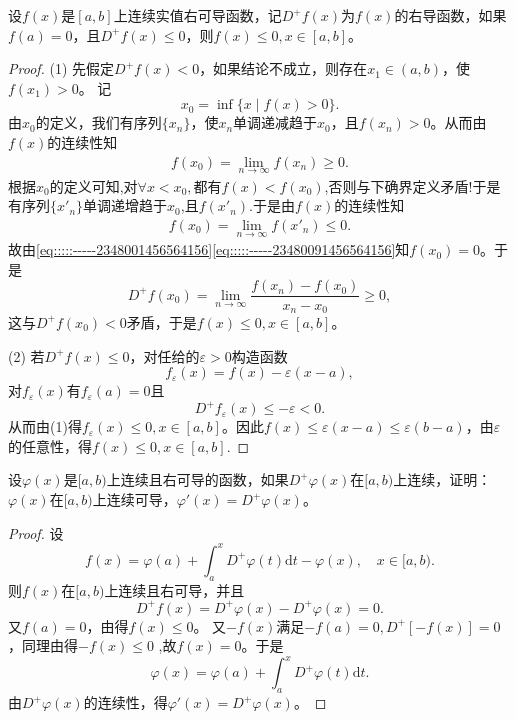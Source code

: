 \documentclass[../../main.tex]{subfiles}
\begin{document}
\begin{proposition}\label{proposition:右导数小于等于0函数值小于端点值}
设\( f(x) \)是\([a,b]\)上连续实值右可导函数，记\( D^+f(x) \)为\( f(x) \)的右导函数，如果\( f(a)=0 \)，且\( D^+f(x) \leqslant0 \)，则\( f(x) \leqslant0, x \in [a,b] \)。
\end{proposition}
\begin{proof}
(1) 先假定\( D^+f(x) < 0 \)，如果结论不成立，则存在\( x_1 \in (a,b) \)，使\( f(x_1) > 0 \)。
记
\[
x_0 = \inf\{ x \mid f(x) > 0 \}.
\]
由\( x_0 \)的定义，我们有序列\(\{ x_n \}\)，使\( x_n \)单调递减趋于\( x_0 \)，且\( f(x_n) > 0 \)。从而由\( f(x) \)的连续性知
\begin{align}
f\left( x_0 \right)=\underset{n\rightarrow \infty}{\lim}f\left( x_n \right) \geqslant 0.\label{eq:::::-----2348001456564156}
\end{align}
根据$x_0$的定义可知,对$\forall x<x_0,$都有$f(x)<f(x_0)$,否则与下确界定义矛盾!于是有序列$\{x'_n\}$单调递增趋于$x_0$,且$f(x'_n).$于是由\( f(x) \)的连续性知
\begin{align}
f\left( x_0 \right)=\underset{n\rightarrow \infty}{\lim}f\left( x'_n \right)  \leqslant 0.\label{eq:::::-----23480091456564156}
\end{align}
故由\eqref{eq:::::-----2348001456564156}\eqref{eq:::::-----23480091456564156}知\( f(x_0)=0 \)。于是
\[
D^+f(x_0) = \lim_{n \to \infty} \frac{f(x_n) - f(x_0)}{x_n - x_0} \geqslant 0,
\]
这与\( D^+f(x_0) < 0 \)矛盾，于是\( f(x) \leqslant 0, x \in [a,b] \)。

(2) 若\( D^+f(x) \leqslant 0 \)，对任给的\( \varepsilon > 0 \)构造函数
\[
f_\varepsilon(x) = f(x) - \varepsilon(x - a),
\]
对\( f_\varepsilon(x) \)有\( f_\varepsilon(a)=0 \)且
\[
D^+f_\varepsilon(x) \leqslant-\varepsilon < 0.
\]
从而由(1)得\( f_\varepsilon(x) \leqslant0, x \in [a,b] \)。因此\( f(x) \leqslant\varepsilon(x - a)\leqslant \varepsilon (b-a) \)，由\( \varepsilon \)的任意性，得\( f(x) \leqslant0, x \in [a,b] \).

\end{proof}

\begin{example}
设\( \varphi(x) \)是\([a,b)\)上连续且右可导的函数，如果\( D^+\varphi(x) \)在\([a,b)\)上连续，证明：\( \varphi(x) \)在\([a,b)\)上连续可导，\( \varphi'(x)=D^+\varphi(x) \)。
\end{example}
\begin{proof}
设
\[
f(x) = \varphi(a) + \int_a^x D^+\varphi(t)\mathrm{d}t - \varphi(x), \quad x \in [a,b).
\]
则\( f(x) \)在\([a,b)\)上连续且右可导，并且
\[
D^+f(x) = D^+\varphi(x) - D^+\varphi(x) = 0.
\]
又\( f(a)=0 \)，由得\( f(x) \leqslant0 \)。
又\(-f(x)\)满足\(-f(a)=0, D^+[-f(x)] = 0\)，同理由得\(-f(x) \leqslant0\) ,故\(f(x)=0\)。于是
\[
\varphi(x) = \varphi(a) + \int_a^x D^+\varphi(t)\mathrm{d}t.
\]
由\( D^+\varphi(x) \)的连续性，得\( \varphi'(x)=D^+\varphi(x) \)。

\end{proof}
\end{document}
